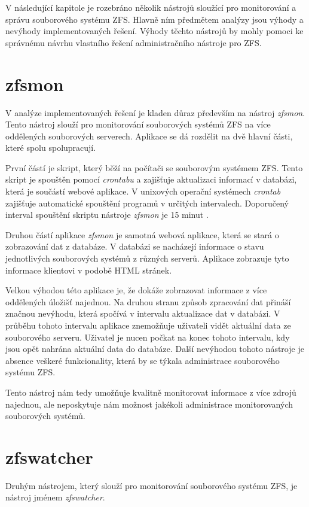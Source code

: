 V následující kapitole je rozebráno několik nástrojů sloužící pro monitorování a správu souborového systému ZFS. Hlavně ním předmětem analýzy jsou výhody a nevýhody implementovaných řešení. Výhody těchto nástrojů by mohly pomoci ke správnému návrhu vlastního řešení administračního nástroje pro ZFS.
\section{zfsmon}
V analýze implementovaných řešení je kladen důraz především na nástroj \emph{zfsmon}. Tento nástroj slouží pro monitorování souborových systémů ZFS na více oddělených souborových serverech. Aplikace se dá rozdělit na dvě hlavní části, které spolu spolupracují.

První částí je skript, který běží na počítači se souborovým systémem ZFS. Tento skript je spouštěn pomocí \emph{crontabu} a zajišťuje aktualizaci informací v databázi, která je součástí webové aplikace. V unixových operační systémech \emph{crontab} zajišťuje automatické spouštění programů v určitých intervalech. Doporučený interval spouštění skriptu nástroje \emph{zfsmon} je 15 minut \cite{zfsmon}.

Druhou částí aplikace \emph{zfsmon} je samotná webová aplikace, která se stará o zobrazování dat z databáze. V databázi se nacházejí informace o stavu jednotlivých souborových systémů z různých serverů. Aplikace zobrazuje tyto informace klientovi v podobě HTML stránek.

Velkou výhodou této aplikace je, že dokáže zobrazovat informace z více oddělených úložišť najednou. Na druhou stranu způsob zpracování dat přináší značnou nevýhodu, která spočívá v intervalu aktualizace dat v databázi. V průběhu tohoto intervalu aplikace znemožňuje uživateli vidět aktuální data ze souborového serveru. Uživatel je nucen počkat na konec tohoto intervalu, kdy jsou opět nahrána aktuální data do databáze. Další nevýhodou tohoto nástroje je absence veškeré funkcionality, která by se týkala administrace souborového systému ZFS.

Tento nástroj nám tedy umožňuje kvalitně monitorovat informace z více zdrojů najednou, ale neposkytuje nám možnost jakékoli administrace monitorovaných souborových systémů.
\section{zfswatcher}
Druhým nástrojem, který slouží pro monitorování souborového systému ZFS, je nástroj jménem \emph{zfswatcher}.

